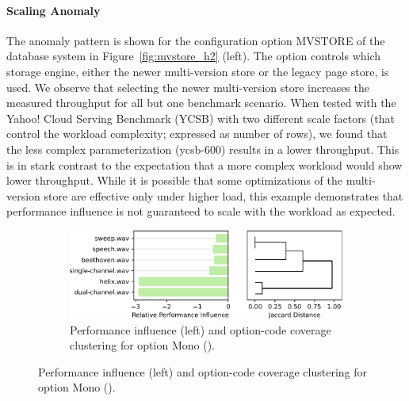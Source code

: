 {{{{\paragraph{Scaling Anomaly} The anomaly pattern is shown for the configuration option \textsf{MVSTORE} of the database system \htwo in Figure~\ref{fig:mvstore_h2} (left). The option controls which storage engine, either the newer multi-version store or the legacy page store, is used. We observe that selecting the newer multi-version store increases the measured throughput for all but one benchmark scenario. When tested with the Yahoo! Cloud Serving Benchmark (YCSB) with two different scale factors (that control the workload complexity; expressed as number of rows), we found that the less complex parameterization (\textsf{ycsb-600}) results in a lower throughput. This is in stark contrast to the expectation that a more complex workload would show lower throughput. While it is possible that some optimizations of the multi-version store are effective only under higher load, this example demonstrates that performance influence is not guaranteed to scale with the workload as expected. 

}

\begin{figure}
	\centering
	\begin{subfigure}{\linewidth}
		\centering
		\includegraphics[width=0.96\linewidth]{images/Mono.pdf}
		\caption{Performance influence (left) and option-code coverage clustering for option \textsf{Mono} (\jumper).}
		\label{fig:mono_jump3r}
	\end{subfigure}
	

\end{figure}}}}
